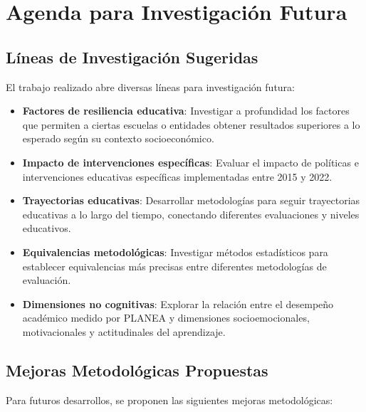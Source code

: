 \section{Agenda para Investigación Futura}

\subsection{Líneas de Investigación Sugeridas}
El trabajo realizado abre diversas líneas para investigación futura:

\begin{itemize}
    \item \textbf{Factores de resiliencia educativa}: Investigar a profundidad los factores que permiten a ciertas escuelas o entidades obtener resultados superiores a lo esperado según su contexto socioeconómico.
    
    \item \textbf{Impacto de intervenciones específicas}: Evaluar el impacto de políticas e intervenciones educativas específicas implementadas entre 2015 y 2022.
    
    \item \textbf{Trayectorias educativas}: Desarrollar metodologías para seguir trayectorias educativas a lo largo del tiempo, conectando diferentes evaluaciones y niveles educativos.
    
    \item \textbf{Equivalencias metodológicas}: Investigar métodos estadísticos para establecer equivalencias más precisas entre diferentes metodologías de evaluación.
    
    \item \textbf{Dimensiones no cognitivas}: Explorar la relación entre el desempeño académico medido por PLANEA y dimensiones socioemocionales, motivacionales y actitudinales del aprendizaje.
\end{itemize}

\subsection{Mejoras Metodológicas Propuestas}
Para futuros desarrollos, se proponen las siguientes mejoras metodológicas:

